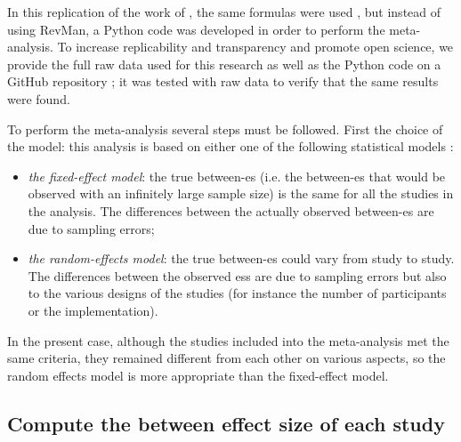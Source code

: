 \documentclass[12pt,a4paper,english]{article}
\begin{document}
In this replication of the work of \citeauthor{Cortese2016}, the same formulas were used \citep{Borenstein2009}, but instead of using RevMan, 
a Python code was developed in order to perform the meta-analysis. To increase replicability and transparency and promote open science, we 
provide the full raw data used for this research as well as the Python code on a GitHub repository \citep{Bussalb2018}; it was tested
with \citet{Cortese2016} raw data to verify that the same results were found. 

To perform the meta-analysis several steps must be followed. First the choice of the model: this analysis is based on either one of the following 
statistical models \citep{Borenstein2009}:
\begin{itemize}
    \item \emph{the fixed-effect model}: the true between-\gls{es} (i.e. the between-\gls{es} that would be observed with an infinitely 
		large sample size) is the same for all the studies in the analysis. The differences between the actually observed between-\gls{es} 
		are due to sampling errors;
    \item \emph{the random-effects model}: the true between-\gls{es} could vary from study to study. The differences between the observed
		\glspl{es} are due to sampling errors but also to the various designs of the studies (for instance the number of participants or the implementation).
\end{itemize}

In the present case, although the studies included into the meta-analysis met the same criteria, they remained different from each other on various aspects,
so the random effects model is more appropriate than the fixed-effect model. 

\subsection{Compute the between effect size of each study}
\end{document}
